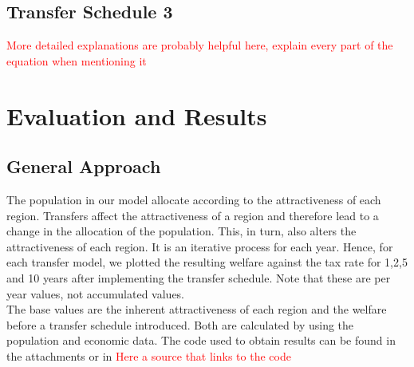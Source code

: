 \documentclass[10pt,a4paper]{article}
\begin{document}
\subsection{Transfer Schedule 3}

\textcolor{red}{More detailed explanations are probably helpful here, explain every part of the equation when mentioning it}

\section{Evaluation and Results}
\subsection{General Approach}
The population in our model allocate according to the attractiveness of each region. Transfers affect the attractiveness of a region and therefore lead to a change in the allocation of the population. This, in turn, also alters the attractiveness of each region. It is an iterative process for each year. Hence, for each transfer model, we plotted the resulting welfare against the tax rate for 1,2,5 and 10 years after implementing the transfer schedule. Note that these are per year values, not accumulated values.
\\
The base values are the inherent attractiveness of each region and the welfare before a transfer schedule introduced. Both are calculated by using the population and economic data. The code used to obtain results can be found in the attachments or in \textcolor{red}{Here a source that links to the code}
\end{document}
